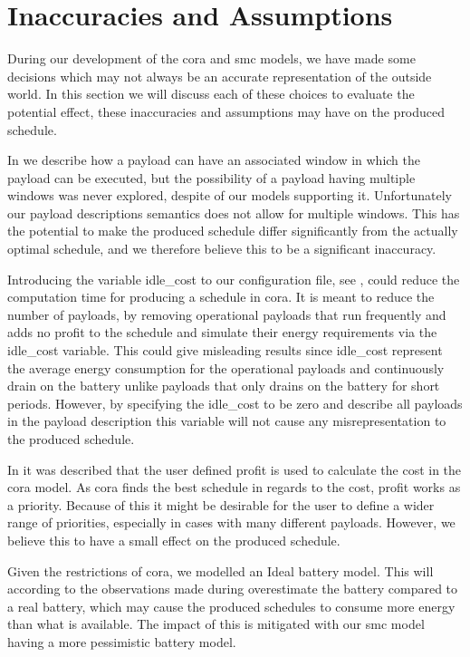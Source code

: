 \section{Inaccuracies and Assumptions}\label{sec:in_and_ass}
During our development of the \gls{cora} and \gls{smc} models, we have made some decisions which may not always be an accurate representation of the outside world. In this section we will discuss each of these choices to evaluate the potential effect, these inaccuracies and assumptions may have on the produced schedule.

In  we describe how a payload can have an associated window in which the payload can be executed, but the possibility of a payload having multiple windows was never explored, despite of our models supporting it. Unfortunately our payload descriptions semantics does not allow for multiple windows. This has the potential to make the produced schedule differ significantly from the actually optimal schedule, and we therefore believe this to be a significant inaccuracy.

Introducing the variable idle\_cost to our configuration file, see , could reduce the computation time for producing a schedule in \gls{cora}. It is meant to reduce the number of payloads, by removing operational payloads that run frequently and adds no profit to the schedule and simulate their energy requirements via the idle\_cost variable. 
This could give misleading results since idle\_cost represent the average energy consumption for the operational payloads and continuously drain on the battery unlike payloads that only drains on the battery for short periods. However, by specifying the idle\_cost to be zero and describe all payloads in the payload description this variable will not cause any misrepresentation to the produced schedule.

In  it was described that the user defined profit is used to calculate the cost in the \gls{cora} model. As \gls{cora} finds the best schedule in regards to the cost, profit works as a priority. Because of this it might be desirable for the user to define a wider range of priorities, especially in cases with many different payloads. However, we believe this to have a small effect on the produced schedule.

Given the restrictions of \gls{cora}, we modelled an Ideal battery model. This will according to the observations made during  overestimate the battery compared to a real battery, which may cause the produced schedules to consume more energy than what is available. The impact of this is mitigated with our \gls{smc} model having a more pessimistic battery model.

